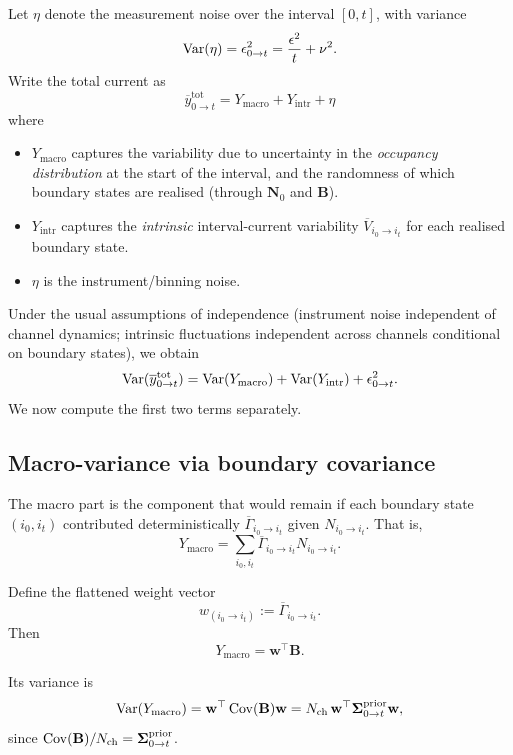 \documentclass[11pt]{article}
\begin{document}
Let \(\eta\) denote the measurement noise over the interval \([0,t]\), with
variance
\[
  \operatorname{Var}(\eta) = \epsilon^2_{0\to t}
  = \frac{\epsilon^2}{t} + \nu^2.
\]
Write the total current as
\[
  \overline{y}^{\text{tot}}_{0\to t}
  =
  Y_{\text{macro}}
  +
  Y_{\text{intr}}
  +
  \eta
\]
where
\begin{itemize}
  \item \(Y_{\text{macro}}\) captures the variability due to uncertainty in the
  \emph{occupancy distribution} at the start of the interval, and the
  randomness of which boundary states are realised (through \(\mathbf{N}_0\) and
  \(\mathbf{B}\)).

  \item \(Y_{\text{intr}}\) captures the \emph{intrinsic} interval-current
  variability \(\overline{V}_{i_0\to i_t}\) for each realised boundary state.

  \item \(\eta\) is the instrument/binning noise.
\end{itemize}

Under the usual assumptions of independence (instrument noise independent of
channel dynamics; intrinsic fluctuations independent across channels conditional
on boundary states), we obtain
\[
  \operatorname{Var}(\overline{y}^{\text{tot}}_{0\to t})
  =
  \operatorname{Var}(Y_{\text{macro}})
  +
  \operatorname{Var}(Y_{\text{intr}})
  +
  \epsilon^2_{0\to t}.
\]
We now compute the first two terms separately.

\subsection{Macro-variance via boundary covariance}

The macro part is the component that would remain if each boundary state
\((i_0,i_t)\) contributed deterministically \(\overline{\Gamma}_{i_0\to i_t}\)
given \(N_{i_0\to i_t}\). That is,
\[
  Y_{\text{macro}}
  =
  \sum_{i_0,i_t}
  \overline{\Gamma}_{i_0\to i_t} N_{i_0\to i_t}.
\]

Define the flattened weight vector
\[
  w_{(i_0\to i_t)}
  := \overline{\Gamma}_{i_0\to i_t}.
\]
Then
\[
  Y_{\text{macro}} = \mathbf{w}^\top\mathbf{B}.
\]

Its variance is
\[
  \operatorname{Var}(Y_{\text{macro}})
  =
  \mathbf{w}^\top\operatorname{Cov}(\mathbf{B})\mathbf{w}
  =
  N_{\text{ch}}\,
  \mathbf{w}^\top
  \boldsymbol{\Sigma}^{\text{prior}}_{0\to t}
  \mathbf{w},
\]
since \(\operatorname{Cov}(\mathbf{B})/N_{\text{ch}}=\boldsymbol{\Sigma}^{\text{prior}}_{0\to t}\).
\end{document}
